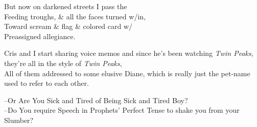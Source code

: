\secdiv



\secdiv


 
\secdiv



\secdiv



\secdiv



\secdiv



\newpage

\secdiv



\secdiv

But now on darkened streets I pass the \\ 
Feeding troughs, \& all the faces turned w/in, \\
Toward scream \& flag \& colored card w/ \\
Preassigned allegiance.

\secdiv



\secdiv



\secdiv



\secdiv

Cris and I start sharing voice memos and since he's been watching \textit{Twin Peaks}, they're all in the style of \textit{Twin Peaks}, \\
All of them addressed to some elusive Diane, which is really just the pet-name used to refer to each other.


% 

\secdiv



\secdiv

--Or Are You Sick and Tired of Being Sick and Tired Boy? \\
--Do You require Speech in Prophets' Perfect Tense to shake you from your Slumber?

